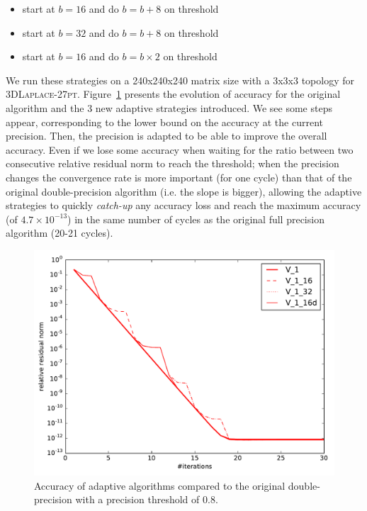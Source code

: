 \begin{itemize}

    \item start at $b=16$ and do $b=b+8$ on threshold

    \item start at $b=32$ and do $b=b+8$ on threshold

    \item start at $b=16$ and do $b=b\times2$ on threshold

\end{itemize}

We run these strategies on a 240x240x240 matrix size with a 3x3x3 topology for
\textsc{3DLaplace-27pt}. Figure~\ref{fig.prec_incr} presents the evolution of
accuracy for the original algorithm and the 3 new adaptive strategies
introduced.  We see some steps appear, corresponding to the lower bound on the
accuracy at the current precision. Then, the precision is adapted to be able to
improve the overall accuracy. Even if we lose some accuracy when waiting for
the ratio between two consecutive relative residual norm to reach the
threshold; when the precision changes the convergence rate is more important
(for one cycle) than that of the original double-precision algorithm (i.e. the
slope is bigger), allowing the adaptive strategies to quickly \emph{catch-up}
any accuracy loss and reach the maximum accuracy (of $4.7\times 10^{-13}$) in
the same number of cycles as the original full precision algorithm (20-21
cycles).

\begin{figure}[htb]
    \centering
    \includegraphics[width=0.9\linewidth]{figs/prec_incr.pdf}
    \caption{Accuracy of adaptive algorithms compared to the original
    double-precision with a precision threshold of $0.8$.}
    \label{fig.prec_incr}
\end{figure}

